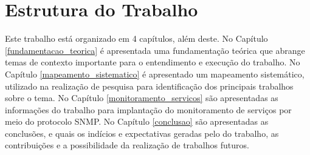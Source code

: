 
\section{Estrutura do Trabalho}

Este trabalho está organizado em 4 capítulos, além deste. No Capítulo \ref{fundamentacao_teorica} é apresentada uma fundamentação teórica que abrange temas de contexto importante para o entendimento e execução do trabalho. No Capítulo \ref{mapeamento_sistematico} é apresentado um mapeamento sistemático, utilizado na realização de pesquisa para identificação dos principais trabalhos sobre o tema. No Capítulo \ref{monitoramento_servicos} são apresentadas as informações do trabalho para implantação do monitoramento de serviços por meio do protocolo \acrshort{SNMP}. No Capítulo \ref{conclusao} são apresentadas as conclusões, e quais os indícios e expectativas geradas pelo do trabalho, as contribuições e a possibilidade da realização de trabalhos futuros.